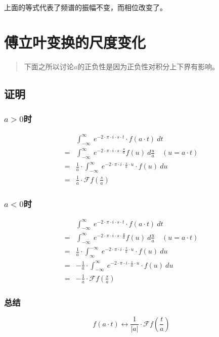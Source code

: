 上面的等式代表了频谱的振幅不变，而相位改变了。

\section{傅立叶变换的尺度变化}
\begin{quote}
	下面之所以讨论$a$的正负性是因为正负性对积分上下界有影响。
\end{quote}
\subsection{证明}
\subsubsection{$a>0$时}
\begin{align*}
	  & \int_{-\infty}^{\infty}\ e^{-2\cdot \pi\cdot i\cdot s\cdot t}\cdot f(a\cdot t)\ dt                          \\
	= & \int_{-\infty}^{\infty}\ e^{-2\cdot \pi\cdot i\cdot s\cdot \frac{u}{a}}f(u)\ d\frac{u}{a}\quad (u=a\cdot t) \\
	= & \frac{1}{a}\cdot \int_{-\infty}^{\infty}\ e^{-2\cdot \pi\cdot i\cdot \frac{s}{a}\cdot u}\cdot f(u)\ du      \\
	= & \frac{1}{a}\cdot \mathcal{F}f(\frac{s}{a})
\end{align*}
\subsubsection{$a<0$时}
\begin{align*}
	  & \int_{-\infty}^{\infty}\ e^{-2\cdot \pi\cdot i\cdot s\cdot t}\cdot f(a\cdot t)\ dt                          \\
	= & \int_{-\infty}^{\infty}\ e^{-2\cdot \pi\cdot i\cdot s\cdot \frac{u}{a}}f(u)\ d\frac{u}{a}\quad (u=a\cdot t) \\
	= & \frac{1}{a}\cdot \int_{\infty}^{-\infty}\ e^{-2\cdot \pi\cdot i\cdot \frac{s}{a}\cdot u}\cdot f(u)\ du      \\
	= & -\frac{1}{a}\cdot \int_{-\infty}^{\infty}\ e^{-2\cdot \pi\cdot i\cdot \frac{s}{a}\cdot u}\cdot f(u)\ du     \\
	= & -\frac{1}{a}\cdot \mathcal{F}f(\frac{s}{a})
\end{align*}
\subsubsection{总结}
$$
	f(a\cdot t)\leftrightarrow \frac{1}{|a|}\cdot \mathcal{F}f(\frac{t}{a})
$$
